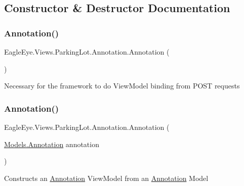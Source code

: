 \subsection{Constructor \& Destructor Documentation}
\mbox{\label{class_eagle_eye_1_1_views_1_1_parking_lot_1_1_annotation_a219a85017ab1fb54045c686bd49e2e32}} 
\subsubsection{\texorpdfstring{Annotation()}{Annotation()}\hspace{0.1cm}{\footnotesize\ttfamily [1/2]}}
{\footnotesize\ttfamily Eagle\+Eye.\+Views.\+Parking\+Lot.\+Annotation.\+Annotation (\begin{DoxyParamCaption}{ }\end{DoxyParamCaption})}



Necessary for the framework to do View\+Model binding from P\+O\+ST requests 

\mbox{\label{class_eagle_eye_1_1_views_1_1_parking_lot_1_1_annotation_a49916dc64f4e7e0a7ab9883c68abf103}} 
\subsubsection{\texorpdfstring{Annotation()}{Annotation()}\hspace{0.1cm}{\footnotesize\ttfamily [2/2]}}
{\footnotesize\ttfamily Eagle\+Eye.\+Views.\+Parking\+Lot.\+Annotation.\+Annotation (\begin{DoxyParamCaption}\item[{\mbox{\hyperlink{class_eagle_eye_1_1_models_1_1_annotation}{Models.\+Annotation}}}]{annotation }\end{DoxyParamCaption})}



Constructs an \mbox{\hyperlink{class_eagle_eye_1_1_views_1_1_parking_lot_1_1_annotation}{Annotation}} View\+Model from an \mbox{\hyperlink{class_eagle_eye_1_1_views_1_1_parking_lot_1_1_annotation}{Annotation}} Model 


